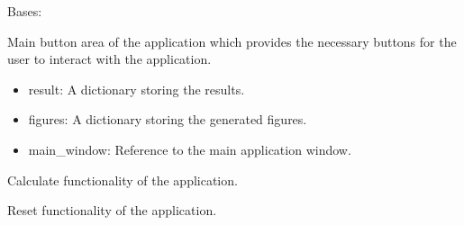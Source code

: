 \documentclass[a4paper,10pt,english]{sphinxmanual}
\begin{document}
\begin{fulllineitems}
\label{\detokenize{gui:src.gui.button_area.ButtonArea}}
\pysigstartsignatures
{}
\pysigstopsignatures
\sphinxAtStartPar
Bases: 

\sphinxAtStartPar
Main button area of the application which provides the necessary buttons for the user to interact with the application.
\begin{description}
\begin{itemize}
\item {} 
\sphinxAtStartPar
result: A dictionary storing the results.

\item {} 
\sphinxAtStartPar
figures: A dictionary storing the generated figures.

\item {} 
\sphinxAtStartPar
main\_window: Reference to the main application window.

\end{itemize}

\end{description}

\begin{fulllineitems}
\label{\detokenize{gui:src.gui.button_area.ButtonArea.calculate}}
\pysigstartsignatures
{}
\pysigstopsignatures
\sphinxAtStartPar
Calculate functionality of the application.

\end{fulllineitems}


\begin{fulllineitems}
\label{\detokenize{gui:src.gui.button_area.ButtonArea.reset}}
\pysigstartsignatures
{}
\pysigstopsignatures
\sphinxAtStartPar
Reset functionality of the application.

\end{fulllineitems}


\end{fulllineitems}
\end{document}
